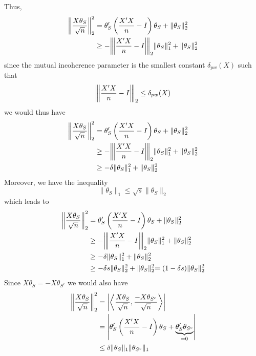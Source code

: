 \documentclass[10pt,handout,english]{beamer}
\newcommand{\vertiii}[1]{{\left\vert\kern-0.25ex\left\vert\kern-0.25ex\left\vert #1 
    \right\vert\kern-0.25ex\right\vert\kern-0.25ex\right\vert}}
\begin{document}
\begin{frame}[allowframebreaks]
Thus, 
\begin{align*}
\left\lVert\frac{X\theta_{S}}{\sqrt{n}}\right\rVert_{2}^{2}&=\theta_{S}'\left(\frac{X'X}{n}-I\right)\theta_{S}+\text{\ensuremath{\Vert}\ensuremath{\theta_{S}\Vert_{2}^{2}}}\\
&\geq-\vertiii{\frac{X'X}{n}-I}_{2}\Vert\theta_{S}\Vert_{1}^{2}+\ensuremath{\Vert}\ensuremath{\theta_{S}\Vert_{2}^{2}}
\end{align*}
since the mutual incoherence parameter is the smallest constant $\delta_{pw}(X)$ such that 
\[
\vertiii{\frac{X'X}{n}-I}_{2}\leq\delta_{pw}(X)
\]
we would thus have
\begin{align*}
\left\lVert\frac{X\theta_{S}}{\sqrt{n}}\right\rVert_{2}^{2}&=\theta_{S}'\left(\frac{X'X}{n}-I\right)\theta_{S}+\text{\ensuremath{\Vert}\ensuremath{\theta_{S}\Vert_{2}^{2}}}\\
&\geq-\vertiii{\frac{X'X}{n}-I}_{2}\Vert\theta_{S}\Vert_{1}^{2}+\ensuremath{\Vert}\ensuremath{\theta_{S}\Vert_{2}^{2}}\\
&\geq-\delta\lVert\theta_{S}\Vert_{1}^{2}+\lVert\theta_{S}\lVert_{2}^{2}
\end{align*}
Moreover, we have the inequality
\[
\lVert\theta_{S}\rVert_{1}\leq\sqrt{s}\lVert\theta_{S}\rVert_{2}
\]
which leads to
\begingroup
\allowdisplaybreaks 
\begin{align}
\left\lVert\frac{X\theta_{S}}{\sqrt{n}}\right\rVert_{2}^{2}&=\theta_{S}'\left(\frac{X'X}{n}-I\right)\theta_{S}+\text{\ensuremath{\Vert}\ensuremath{\theta_{S}\Vert_{2}^{2}}}\\
&\geq-\vertiii{\frac{X'X}{n}-I}_{2}\Vert\theta_{S}\Vert_{1}^{2}+\ensuremath{\Vert}\ensuremath{\theta_{S}\Vert_{2}^{2}}\\
&\geq-\delta\lVert\theta_{S}\Vert_{1}^{2}+\lVert\theta_{S}\lVert_{2}^{2}\\
&\geq-\delta s\lVert\theta_{S}\rVert_{2}^{2}+\lVert\theta_{S}\lVert_{2}^{2}=(1-\delta s)\lVert\theta_{S}\rVert_{2}^{2}
\end{align}
\endgroup
Since $X\theta_{S}=-X\theta_{S^{c}}$ we would also have 
\begingroup
\begin{align}
\allowdisplaybreaks
\left\lVert\frac{X\theta_{S}}{\sqrt{n}}\right\rVert_{2}^{2}&=\left\lvert\left\langle\frac{X\theta_S}{\sqrt{n}},\frac{-X\theta_{S^c}}{\sqrt{n}}\right\rangle\right\rvert\\
&=\left\lvert\theta_{S}'\left(\frac{X'X}{n}-I\right)\theta_{S}+\underbrace{\theta_{S}'\theta_{S^{c}}}_{=0}\right\rvert\\
&\leq\delta\lVert\theta_{S}\rVert_{1}\lVert\theta_{S^{c}}\rVert_{1}\\

\end{align}
\end{frame}
\end{document}

